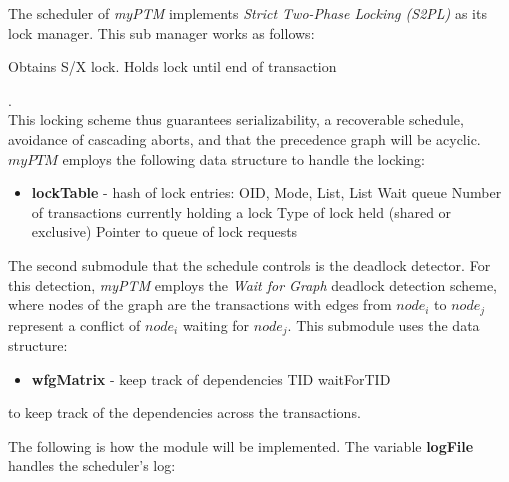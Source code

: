 The scheduler of \textit{myPTM} implements \textit{Strict Two-Phase Locking (S2PL)} as its lock manager. This sub manager works as follows:

\begin{algorithmic}

	\State Obtains S/X lock.
	\State Holds lock until end of transaction 
	\EndIf
   
\end{algorithmic}  . \\

This locking scheme thus guarantees serializability, a recoverable schedule, avoidance of cascading aborts, and that the precedence graph will be acyclic. $myPTM$ employs the following data structure to handle the locking:

\begin{itemize}
\item \textbf{lockTable} - hash of lock entries: OID, Mode, List, List Wait queue
\subitem Number of transactions currently holding a lock
\subitem Type of lock held (shared or exclusive)
\subitem Pointer to queue of lock requests
\end{itemize}

The second submodule that the schedule controls is the deadlock detector. For this detection, \textit{myPTM} employs the \textit{Wait for Graph} deadlock detection scheme, where nodes of the graph are the transactions with edges from $node_i$ to $node_j$ represent a conflict of $node_i$ waiting for $node_j$. This submodule uses the data structure:

\begin{itemize}
\item \textbf{wfgMatrix} - keep track of dependencies 
\subitem TID
\subitem waitForTID
\end{itemize}

to keep track of the dependencies across the transactions. 

The following is how the module will be implemented. The variable \textbf{logFile} handles the scheduler's log: \\

